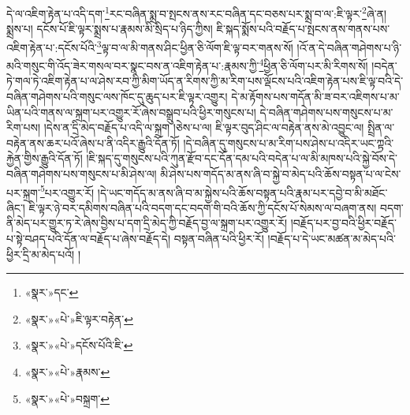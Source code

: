 དེ་ལ་འཇིག་རྟེན་པ་འདི་དག་\footnote{«སྣར་»དང་}རང་བཞིན་སྨྲ་བ་སྤངས་ནས་རང་བཞིན་དང་བཅས་པར་སྨྲ་བ་ལ་:ཇི་ལྟར་\footnote{«སྣར་»«པེ་»ཇི་ལྟར་བརྟེན་}ཞེ་ན། སྨྲས་པ། དངོས་པོ་ཇི་ལྟར་སྨྲས་པ་རྣམས་མི་སྲིད་པ་ཉིད་ཀྱིས། ཇི་སྐད་སྨོས་པའི་བརྗོད་པ་སྤངས་ནས་གནས་པས་འཇིག་རྟེན་པ་:དངོས་པོའི་\footnote{«སྣར་»«པེ་»དངོས་པོའི་ཇི་}ལྟ་བ་ལ་མི་གནས་ཤིང་ཕྱིན་ཅི་ལོག་ཇི་ལྟ་བར་གནས་སོ། །འོ་ན་དེ་བཞིན་གཤེགས་པ་ཉི་མའི་གསུང་གི་འོད་ཟེར་གསལ་བར་སྣང་བས་ན་འཇིག་རྟེན་པ་:རྣམས་ཀྱི་\footnote{«སྣར་»«པེ་»རྣམས་}ཕྱིན་ཅི་ལོག་པར་མི་རིགས་སོ། །བདེན་ཏེ་གལ་ཏེ་འཇིག་རྟེན་པ་ལ་ཤེས་རབ་ཀྱི་མིག་ཡོད་ན་རིགས་ཀྱི་མ་རིག་པས་ལྡོངས་པའི་འཇིག་རྟེན་པས་ཇི་ལྟ་བའི་དེ་བཞིན་གཤེགས་པའི་གསུང་ལས་ཁོང་དུ་ཆུད་པར་ཇི་ལྟར་འགྱུར། དེ་མ་རྟོགས་པས་གདོན་མི་ཟ་བར་འཇིགས་པ་མ་ཡིན་པའི་གནས་ལ་སྐྲག་པར་འགྱུར་རོ་ཞེས་བསྒྲུབ་པའི་ཕྱིར་གསུངས་པ། དེ་བཞིན་གཤེགས་པས་གསུངས་པ་མ་རིག་པས། །དེས་ན་དྲི་མེད་བརྗོད་པ་འདི་ལ་སྐྲག །ཅེས་པ་ལ། ཇི་ལྟར་བུད་ཤིང་ལ་བརྟེན་ནས་མེ་འབྱུང་ལ། སྤྲིན་ལ་བརྟེན་ནས་ཆར་པའོ་ཞེས་པ་ནི་འདིར་རྒྱུའི་དོན་ཏོ། །དེ་བཞིན་དུ་གསུངས་པ་མ་རིག་པས་ཤེས་པ་འདིར་ཡང་ཀྟའི་རྐྱེན་གྱིས་རྒྱུའི་དོན་ཏོ། །ཇི་སྐད་དུ་གསུངས་པའི་ཀུན་རྫོབ་དང་དོན་དམ་པའི་བདེན་པ་ལ་མི་མཁས་པའི་སྐྱེ་བོས་དེ་བཞིན་གཤེགས་པས་གསུངས་པ་མི་ཤེས་ལ། མི་ཤེས་པས་གདོད་མ་ནས་ཞི་བ་སྐྱེ་བ་མེད་པའི་ཆོས་བསྟན་པ་ལ་ངེས་པར་སྐྲག་\footnote{«སྣར་»«པེ་»བསྐྲག་}པར་འགྱུར་རོ། །དེ་ཡང་གདོད་མ་ནས་ཞི་བ་མ་སྐྱེས་པའི་ཆོས་བསྟན་པའི་རྣམ་པར་དབྱེ་བ་མི་མཐོང་ཞིང་། ཇི་ལྟར་ཉེ་བར་དམིགས་བཞིན་པའི་བདག་དང་བདག་གི་བའི་ཆོས་ཀྱི་དངོས་པོ་སེམས་ལ་བཞག་ནས། བདག་ནི་མེད་པར་གྱུར་ཏ་རེ་ཞེས་བྱིས་པ་དག་དྲི་མེད་ཀྱི་བརྗོད་བྱ་ལ་སྐྲག་པར་འགྱུར་རོ། །བརྗོད་པར་བྱ་བའི་ཕྱིར་བརྗོད་པ་སྟེ་བཤད་པའི་དོན་ལ་བརྗོད་པ་ཞེས་བརྗོད་དེ། བསྟན་བཞིན་པའི་ཕྱིར་རོ། །བརྗོད་པ་དེ་ཡང་མཚན་མ་མེད་པའི་ཕྱིར་དྲི་མ་མེད་པའོ། །
